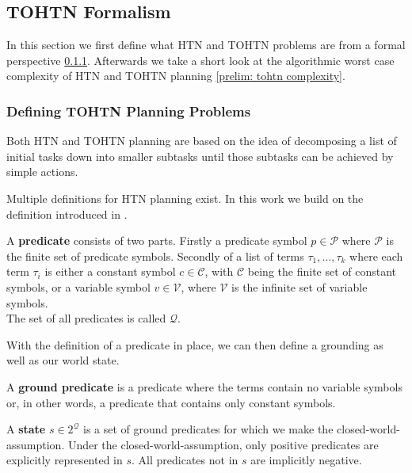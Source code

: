 \subsection{TOHTN Formalism}
In this section we first define what HTN and TOHTN problems are from a formal perspective \ref{prelim: tohtn problems}. Afterwards we take a short look at the algorithmic worst case complexity of HTN and TOHTN planning \ref{prelim: tohtn complexity}.

\subsubsection{Defining TOHTN Planning Problems}
\label{prelim: tohtn problems}
Both HTN and TOHTN planning are based on the idea of decomposing a list of initial tasks down into smaller subtasks until those subtasks can be achieved by simple actions.

Multiple definitions for HTN planning exist. In this work we build on the definition introduced in \cite{georgievski2015htn}.

\begin{definition} %
	A \textbf{predicate} consists of two parts. Firstly a predicate symbol $p \in \mathcal{P}$ where $\mathcal{P}$ is the finite set of predicate symbols. Secondly of a list of terms $\tau_1, \ldots, \tau_k$ where each term $\tau_i$ is either a constant symbol $c \in \mathcal{C}$, with $\mathcal{C}$ being the finite set of constant symbols, or a variable symbol $v \in \mathcal{V}$, where $\mathcal{V}$ is the infinite set of variable symbols. \\
	The set of all predicates is called $\mathcal{Q}$.
\end{definition}
With the definition of a predicate in place, we can then define a grounding as well as our world state.
\begin{definition} %
	A \textbf{ground predicate} is a predicate where the terms contain no variable symbols or, in other words, a predicate that contains only constant symbols.
\end{definition}
\begin{definition} %
	A \textbf{state} $s \in 2^{\mathcal{Q}}$ is a set of ground predicates for which we make the closed-world-assumption. Under the closed-world-assumption, only positive predicates are explicitly represented in $s$. All predicates not in $s$ are implicitly negative.
\end{definition}


